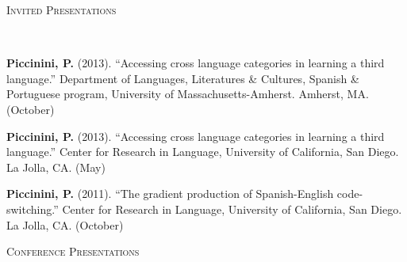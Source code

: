 \documentclass[9pt]{article}
\newenvironment{changemargin}[2]{%
  \begin{list}{}{%
    \setlength{\topsep}{0pt}%
    \setlength{\leftmargin}{#1}%
    \setlength{\rightmargin}{#2}%
    \setlength{\listparindent}{\parindent}%
    \setlength{\itemindent}{\parindent}%
    \setlength{\parsep}{\parskip}%
  }%
  \item[]}{\end{list}
}
\newcommand{\lineover}{
	\begin{changemargin}{-0.05in}{-0.05in}
		\vspace*{-8pt}
		\hrulefill \\
		\vspace*{-2pt}
	\end{changemargin}
}
\newcommand{\header}[1]{
	\begin{changemargin}{-0.5in}{-0.5in}
		\scshape{#1}\\
  	\lineover
	\end{changemargin}
}
\newenvironment{body} {
	\vspace*{-16pt}
	\begin{changemargin}{-0.25in}{-0.5in}
  }	
	{\end{changemargin}
}
\begin{document}
\smallskip


\header{Invited Presentations}

\begin{body}
	\vspace{14pt}

	\textbf{Piccinini, P.} (2013). ``Accessing cross language categories in learning a third language.''  Department of Languages, Literatures \& Cultures, Spanish \& Portuguese program, University of Massachusetts-Amherst. Amherst, MA. (October)\\
	\medskip
	
	\textbf{Piccinini, P.} (2013). ``Accessing cross language categories in learning a third language.''  Center for Research in Language, University of California, San Diego. La Jolla, CA. (May)\\
	\medskip
	
	\textbf{Piccinini, P.} (2011). ``The gradient  production of Spanish-English code-switching.''  Center for Research in Language, University of California, San Diego. La Jolla, CA. (October)\\
	\medskip
	
\end{body}

\smallskip



\header{Conference Presentations}
\end{document}
